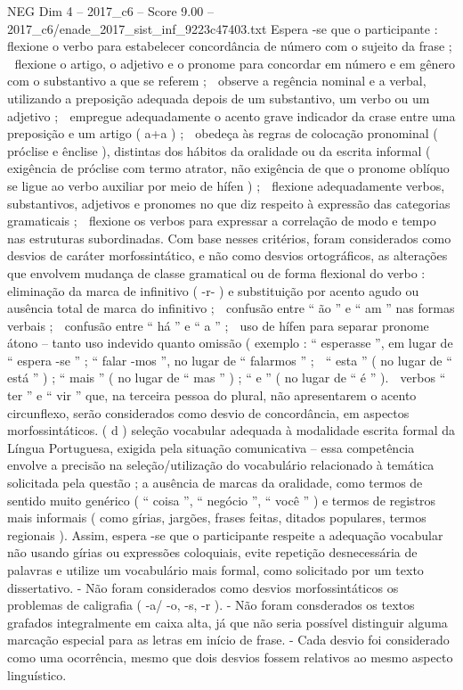 \begin{textsample}{NEG Dim 4 – 2017\_c6 – Score 9.00 – 2017\_c6/enade\_2017\_sist\_inf\_9223c47403.txt}
Espera -se que o participante :  flexione o verbo para estabelecer concordância de número com o sujeito da frase ;  flexione o artigo, o adjetivo e o pronome para concordar em número e em gênero com o substantivo a que se referem ;  observe a regência nominal e a verbal, utilizando a preposição adequada depois de um substantivo, um verbo ou um adjetivo ;  empregue adequadamente o acento grave indicador da crase entre uma preposição e um artigo ( a+a ) ;  obedeça às regras de colocação pronominal ( próclise e ênclise ), distintas dos hábitos da oralidade ou da escrita informal ( exigência de próclise com termo atrator, não exigência de que o pronome oblíquo se ligue ao verbo auxiliar por meio de hífen ) ;  flexione adequadamente verbos, substantivos, adjetivos e pronomes no que diz respeito à expressão das categorias gramaticais ;  flexione os verbos para expressar a correlação de modo e tempo nas estruturas subordinadas.
Com base nesses critérios, foram considerados como desvios de caráter morfossintático, e não como desvios ortográficos, as alterações que envolvem mudança de classe gramatical ou de forma flexional do verbo :  eliminação da marca de infinitivo ( -r- ) e substituição por acento agudo ou ausência total de marca do infinitivo ;  confusão entre “ ão ” e “ am ” nas formas verbais ;  confusão entre “ há ” e “ a ” ;  uso de hífen para separar pronome átono – tanto uso indevido quanto omissão ( exemplo : “ esperasse ”, em lugar de “ espera -se ” ; “ falar -mos ”, no lugar de “ falarmos ” ;  “ esta ” ( no lugar de “ está ” ) ; “ mais ” ( no lugar de “ mas ” ) ; “ e ” ( no lugar de “ é ” ).  verbos “ ter ” e “ vir ” que, na terceira pessoa do plural, não apresentarem o acento circunflexo, serão considerados como desvio de concordância, em aspectos morfossintáticos. ( d ) seleção vocabular adequada à modalidade escrita formal da Língua Portuguesa, exigida pela situação comunicativa – essa competência envolve a precisão na seleção/utilização do vocabulário relacionado à temática solicitada pela questão ; a ausência de marcas da oralidade, como termos de sentido muito genérico ( “ coisa ”, “ negócio ”, “ você ” ) e termos de registros mais informais ( como gírias, jargões, frases feitas, ditados populares, termos regionais ).
Assim, espera -se que o participante respeite a adequação vocabular não usando gírias ou expressões coloquiais, evite repetição desnecessária de palavras e utilize um vocabulário mais formal, como solicitado por um texto dissertativo. - Não foram considerados como desvios morfossintáticos os problemas de caligrafia ( -a/ -o, -s, -r ). - Não foram consderados os textos grafados integralmente em caixa alta, já que não seria possível distinguir alguma marcação especial para as letras em início de frase. - Cada desvio foi considerado como uma ocorrência, mesmo que dois desvios fossem relativos ao mesmo aspecto linguístico.

\end{textsample}
